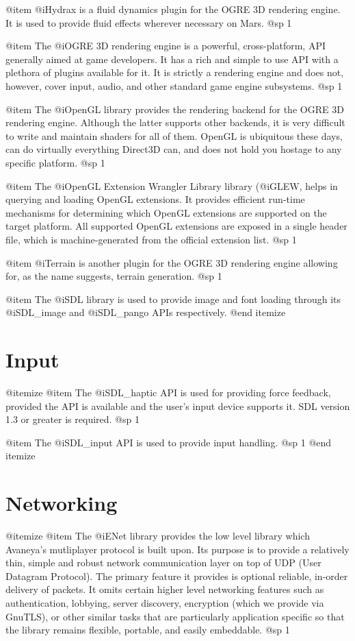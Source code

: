 @item
@i{Hydrax} is a fluid dynamics plugin for the OGRE 3D rendering engine. It is used to provide fluid effects wherever necessary on Mars.
@sp 1

@item
The @i{OGRE 3D} rendering engine is a powerful, cross-platform, API generally aimed at game developers. It has a rich and simple to use API with a plethora of plugins available for it. It is strictly a rendering engine and does not, however, cover input, audio, and other standard game engine subsystems.
@sp 1

@item
The @i{OpenGL} library provides the rendering backend for the OGRE 3D rendering engine. Although the latter supports other backends, it is very difficult to write and maintain shaders for all of them. OpenGL is ubiquitous these days, can do virtually everything Direct3D can, and does not hold you hostage to any specific platform.
@sp 1

@item
The @i{OpenGL Extension Wrangler Library} library (@i{GLEW}, helps in querying and loading OpenGL extensions. It provides efficient run-time mechanisms for determining which OpenGL extensions are supported on the target platform. All supported OpenGL extensions are exposed in a single header file, which is machine-generated from the official extension list.
@sp 1

@item
@i{Terrain} is another plugin for the OGRE 3D rendering engine allowing for, as the name suggests, terrain generation.
@sp 1

@item
The @i{SDL} library is used to provide image and font loading through its @i{SDL_image} and @i{SDL_pango} APIs respectively.
@end itemize

\section{Input}

@itemize
@item
The @i{SDL_haptic} API is used for providing force feedback, provided the API is available and the user's input device supports it. SDL version 1.3 or greater is required.
@sp 1

@item
The @i{SDL_input} API is used to provide input handling.
@sp 1
@end itemize

\section{Networking}

@itemize
@item
The @i{ENet} library provides the low level library which Avaneya's mutliplayer protocol is built upon. Its purpose is to provide a relatively thin, simple and robust network communication layer on top of UDP (User Datagram Protocol). The primary feature it provides is optional reliable, in-order delivery of packets. It omits certain higher level networking features such as authentication, lobbying, server discovery, encryption (which we provide via GnuTLS), or other similar tasks that are particularly application specific so that the library remains flexible, portable, and easily embeddable.
@sp 1

